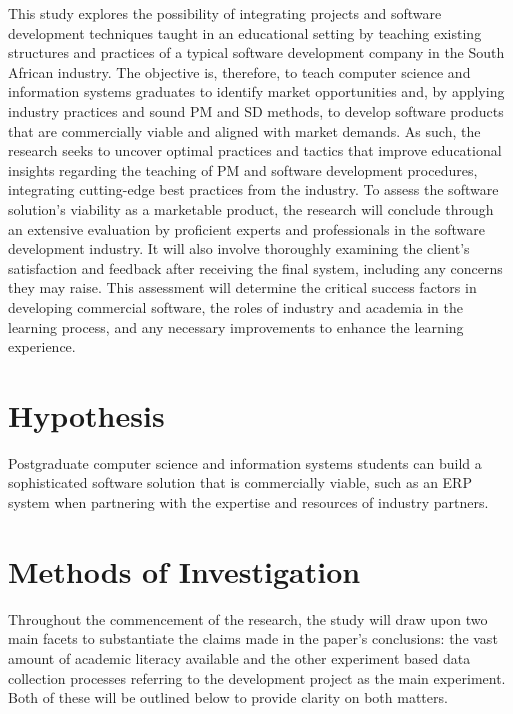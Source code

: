 \par{This study explores the possibility of integrating projects and software development techniques taught in an educational setting by teaching existing structures and practices of a typical software development company in the South African industry. The objective is, therefore, to teach computer science and information systems graduates to identify market opportunities and, by applying industry practices and sound PM and SD methods, to develop software products that are commercially viable and aligned with market demands. As such, the research seeks to uncover optimal practices and tactics that improve educational insights regarding the teaching of PM and software development procedures, integrating cutting-edge best practices from the industry. To assess the software solution's viability as a marketable product, the research will conclude through an extensive evaluation by proficient experts and professionals in the software development industry. It will also involve thoroughly examining the client's satisfaction and feedback after receiving the final system, including any concerns they may raise. This
assessment will determine the critical success factors in developing commercial software, the roles of industry and academia in the learning process, and any necessary improvements to enhance the learning experience.}

\section{Hypothesis}
\par{Postgraduate computer science and information systems students can build a sophisticated software solution that is commercially viable, such as an ERP system when partnering with the expertise and resources of industry partners.}

\section{Methods of Investigation}
\par{Throughout the commencement of the research, the study will draw upon two main facets to substantiate the claims made in the paper's conclusions: the vast amount of academic literacy available and the other experiment based data collection processes referring to the development project as the main experiment. Both of these will be outlined below to provide clarity on both matters.}
